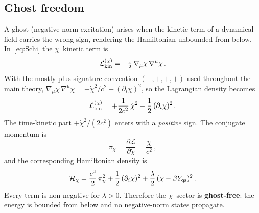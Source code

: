 \documentclass[11pt]{article}
\begin{document}
\subsection{Ghost freedom}\label{sec:ghost_app13}
A ghost (negative-norm excitation) arises when the
kinetic term of a dynamical field carries the wrong
sign, rendering the Hamiltonian unbounded from below.
In~\eqref{eq:Schi} the $\chi$~kinetic term is
\begin{equation}
\mathcal{L}_{\rm kin}^{(\chi)}
= -\tfrac{1}{2}\,\nabla_\mu\chi\,\nabla^\mu\chi\,.
\label{eq:Lkin}
\end{equation}
With the mostly-plus signature convention
$(-,+,+,+)$ used throughout the main theory,
$\nabla_\mu\chi\,\nabla^\mu\chi
= -\dot\chi^2/c^2 + (\partial_i\chi)^2$,
so the Lagrangian density becomes
\begin{equation}
\mathcal{L}_{\rm kin}^{(\chi)}
= +\frac{1}{2c^2}\,\dot\chi^2
  - \frac{1}{2}\,(\partial_i\chi)^2\,.
\label{eq:Lkin_3p1}
\end{equation}
The time-kinetic part $+\dot\chi^2/(2c^2)$ enters
with a \emph{positive} sign.  The conjugate momentum is
\begin{equation}
\pi_\chi = \frac{\partial\mathcal{L}}{\partial\dot\chi}
= \frac{\dot\chi}{c^2}\,,
\label{eq:pi_chi}
\end{equation}
and the corresponding Hamiltonian density is
\begin{equation}
\mathcal{H}_\chi
= \frac{c^2}{2}\,\pi_\chi^2
  + \frac{1}{2}\,(\partial_i\chi)^2
  + \frac{\lambda}{2}\,(\chi - \beta Y_{\rm qs})^2\,.
\label{eq:H_chi}
\end{equation}
Every term is non-negative for $\lambda > 0$.
Therefore the $\chi$~sector is \textbf{ghost-free}:
the energy is bounded from below and no negative-norm
states propagate.
\end{document}
